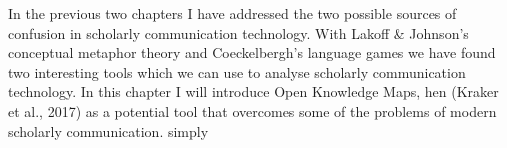 In the previous two chapters I have addressed the two possible sources of confusion in scholarly communication technology. With Lakoff & Johnson’s conceptual metaphor theory and Coeckelbergh’s language games we have found two interesting tools which we can use to analyse scholarly communication technology. In this chapter I will introduce Open Knowledge Maps, hen (Kraker et al., 2017) as a potential tool that overcomes some of the problems of modern scholarly communication. simply
